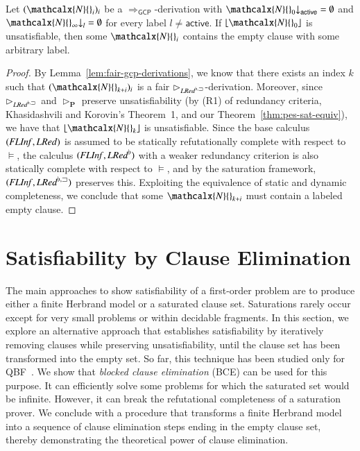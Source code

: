 \begin{rep}
\begin{theorem}
\label{thm:gcp-complete}
Let $(\mathcalx{N}{}_i)_i$ be a $\Longrightarrow_\mathsf{GCP}$-derivation
with
$\mathcalx{N}{}_0{\downarrow}_\mathsf{active} = \emptyset$
and
$\mathcalx{N}{}_\infty{\downarrow}_l = \emptyset$ for every label
$l \not= \ensuremath{\mathsf{active}}$.
If $\lfloor \mathcalx{N}{}_0\rfloor$ is unsatisfiable,
then
some $\mathcalx{N}{}_i$
contains the empty clause with some arbitrary label.
\end{theorem}

\begin{proof}
By Lemma~\ref{lem:fair-gcp-derivations},
we know that there exists an index $k$ such that
$(\mathcalx{N}{}_{k+i})_i$ is a fair $\rhd_{\mathit{LRed}^{\flat,\sqsupset}}$-derivation.
Moreover, since
$\rhd_{\mathit{LRed}^{\flat,\sqsupset}}$ and
$\rhd_\mathbf{P}$ preserve unsatisfiability
(by (R1) of redundancy criteria, Khasidashvili and Korovin's Theorem~1, and our
Theorem~\ref{thm:pes-sat-equiv}), we have that
$\lfloor \mathcalx{N}{}_k\rfloor$ is unsatisfiable.
Since the base calculus $(\mathit{FLInf},\allowbreak\mathit{LRed})$ is assumed to be statically
refutationally complete with respect to $\models$, the calculus
$(\mathit{FLInf},\allowbreak\mathit{LRed}^{\flat})$ with a weaker redundancy criterion is also
statically complete with respect to $\models$, and by the saturation framework,
$(\mathit{FLInf},\allowbreak\mathit{LRed}^{\flat,\sqsupset})$ preserves this. Exploiting the equivalence of
static and dynamic completeness, we conclude that some $\mathcalx{N}{}_{k+i}$ must
contain a labeled empty clause.
\end{proof}
\end{rep}

\section{Satisfiability by Clause Elimination}
\label{sec:satfol:satisfiability-by-clause-elimination}

The main approaches to show satisfiability of a first-order problem are to
produce either a finite Herbrand model or a saturated clause set. Saturations
rarely occur except for very small problems or within decidable fragments. In
this section, we explore an alternative approach that establishes satisfiability
by iteratively removing clauses while preserving
unsatisfiability,
until the clause set has been transformed into the empty set. So
far, this technique has been studied only for QBF~\cite{hsb-14-QRAT}. We show that
\emph{blocked clause elimination} (BCE)
can be used for this purpose. It can efficiently solve some problems for which
the saturated set would be infinite. However, it can break the refutational
completeness of a saturation prover. We conclude with a procedure that
transforms a finite Herbrand model into a sequence of clause elimination steps
ending in the empty clause set, thereby demonstrating the theoretical power of
clause elimination.

